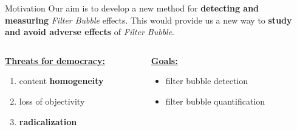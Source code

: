 \documentclass{beamer}
\begin{document}
\begin{frame}[fragile]
\begin{columns}[T]
\begin{column}{.33\textwidth}
\end{column}
\begin{column}{.63\textwidth}
\begin{customalertblock}{Motivation}
    Our aim is to develop a new method for \textbf{detecting and measuring} \textit{Filter Bubble} effects. This would provide us a new way to \textbf{study and avoid adverse effects} of \textit{Filter Bubble}.
    \vspace{1cm}
    \begin{columns}
        \begin{column}{.5\textwidth}
            \underline{\textbf{Threats for democracy:}}
            \vspace{0.5cm}
            \begin{enumerate}
                \item content \textbf{homogeneity}
                \item loss of objectivity
                \item \textbf{radicalization}
            \end{enumerate}
        \end{column}
        \begin{column}{.5\textwidth}
            \underline{\textbf{Goals:}}
            \vspace{0.5cm}
            \begin{itemize}
                \item filter bubble detection
                \item filter bubble quantification
            \end{itemize}
        \end{column}
    \end{columns}
    \vspace{1cm}
\end{customalertblock}

\end{column}
\end{columns}
\end{frame}
\end{document}

